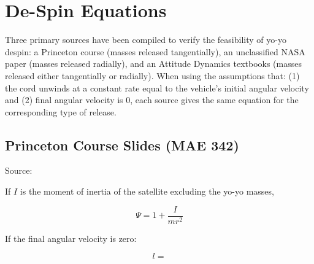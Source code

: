 \section{De-Spin Equations}
Three primary sources have been compiled to verify the feasibility of yo-yo despin: a Princeton course \cite{princeton-course} (masses released tangentially), an unclassified NASA paper \cite{eom-despin-dtic} (masses released radially), and an Attitude Dynamics textbooks \cite{curtis-orbital-mech} (masses released either tangentially or radially). When using the assumptions that: (1) the cord unwinds at a constant rate equal to the vehicle’s initial angular velocity and (2) final angular velocity is 0, each source gives the same equation for the corresponding type of release.

\subsection{Princeton Course Slides (MAE 342)}
Source: \cite{princeton-course}

If \(I\) is the moment of inertia of the satellite excluding the yo-yo masses,

\[ \Psi = 1 + \frac{I}{mr^2} \]

If the final angular velocity is zero:

\[ l =  \]